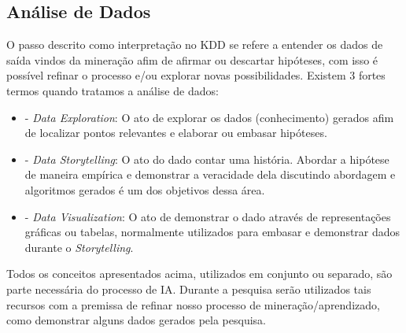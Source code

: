 \subsection{Análise de Dados}
O passo descrito como interpretação no KDD se refere a entender os dados de saída vindos da mineração afim de afirmar ou descartar hipóteses, com isso é possível refinar o processo e/ou explorar novas possibilidades. Existem 3 fortes termos quando tratamos a análise de dados:
\begin{itemize}
    \item - \textit{Data Exploration}: O ato de explorar os dados (conhecimento) gerados afim de localizar pontos relevantes e elaborar ou embasar hipóteses.
    \item - \textit{Data Storytelling}: O ato do dado contar uma história. Abordar a hipótese de maneira empírica e demonstrar a veracidade dela discutindo abordagem e algoritmos gerados é um dos objetivos dessa área.
    \item - \textit{Data Visualization}: O ato de demonstrar o dado através de representações gráficas ou tabelas, normalmente utilizados para embasar e demonstrar dados durante o \textit{Storytelling}.
\end{itemize}

Todos os conceitos apresentados acima, utilizados em conjunto ou separado, são parte necessária do processo de IA. Durante a pesquisa serão utilizados tais recursos com a premissa de refinar nosso processo de mineração/aprendizado, como demonstrar alguns dados gerados pela pesquisa.